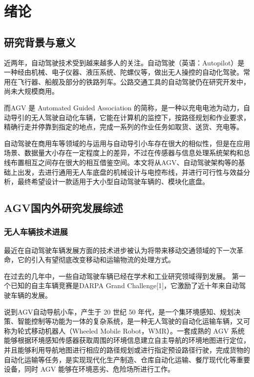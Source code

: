 \newpage
\setcounter{page}{1}
\cfoot{\thepage}

\section{绪论}
\subsection{研究背景与意义}

近两年，自动驾驶技术受到越来越多人的关注。自动驾驶（英语：Autopilot）是一种经由机械、电子仪器、液压系统、陀螺仪等，做出无人操控的自动化驾驶。常用在飞行器、船舰及部分的铁路列车。公路交通工具的自动驾驶仍在研究开发中，尚未大规模商用。

而AGV 是 Automated Guided Association 的简称，是一种以充电电池为动力，自动导引的无人驾驶自动化车辆，它能在计算机的监控下，按路径规划和作业要求，精确行走并停靠到指定的地点，完成一系列的作业任务如取货、送货、充电等。

自动驾驶在商用车等领域的与运用与自动导引小车存在很大的相似性，但是在应用场景、数据量大小存在一定程度上的差异，不过在传感器与信息处理系统架构和总线布置相互之间存在很大的相互借鉴空间。本文将从AGV、自动驾驶架构等的基础上出发，去进行通用无人车底盘的机械设计与电控布线，并进行可行性与效益分析，最终希望设计一款适用于大小型自动驾驶车辆的、模块化底盘。

\subsection{AGV国内外研究发展综述}

\subsubsection{无人车辆技术进展}

最近在自动驾驶车辆发展方面的技术进步被认为将带来移动交通领域的下一次革命，它的引入有望彻底改变移动和运输物流的处理方式。

在过去的几年中，一些自动驾驶车辆已经在学术和工业研究领域得到发展。 第一个已知的自主车辆竞赛是DARPA Grand Challenge[1]，它激励了近十年来自动驾驶车辆的发展。

说到AGV自动导航小车，产生于 20 世纪 50 年代，是一个集环境感知、规划决策、智能控制等功能为一体的复杂系统，是一种无人驾驶的自动化运输车辆，又可称为轮式移动机器人（Wheeled Mobile Robot，WMR）。一套成熟的 AGV 系统能够根据环境感知传感器获取周围的环境信息建立自主导航的环境地图进行定位，并且能够利用导航地图进行相应的路径规划或进行指定预设路径行驶，完成货物的自动化运输等任务，是实现现代化生产制造、仓库自动化运输、餐厅现代化等重要设备，同时 AGV 能够在环境恶劣、危险场所进行工作。


